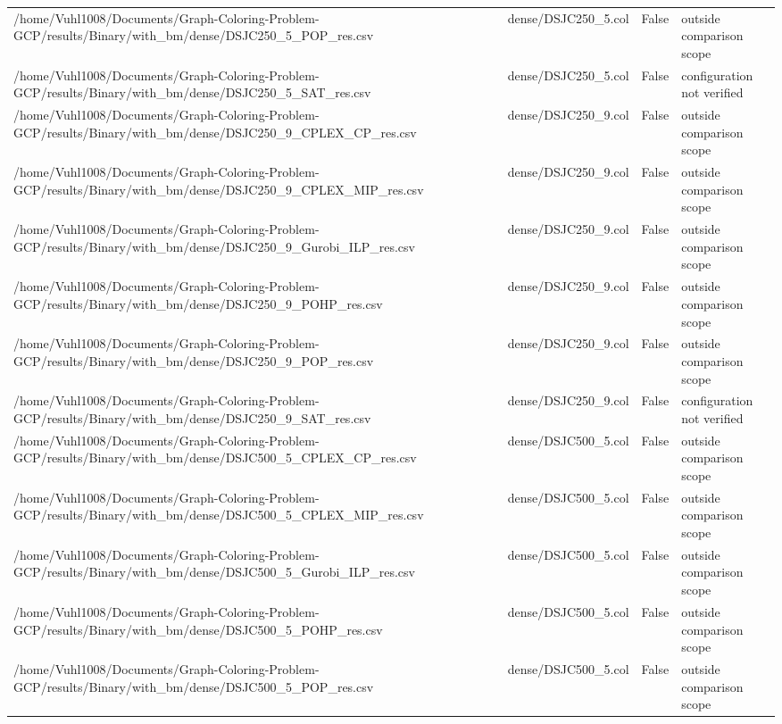 \begin{table}[htbp]
\begin{tabular}{llll}
/home/Vuhl1008/Documents/Graph-Coloring-Problem-GCP/results/Binary/with\_bm/dense/DSJC250\_5\_POP\_res.csv & dense/DSJC250\_5.col & False & outside comparison scope \\
/home/Vuhl1008/Documents/Graph-Coloring-Problem-GCP/results/Binary/with\_bm/dense/DSJC250\_5\_SAT\_res.csv & dense/DSJC250\_5.col & False & configuration not verified \\
/home/Vuhl1008/Documents/Graph-Coloring-Problem-GCP/results/Binary/with\_bm/dense/DSJC250\_9\_CPLEX\_CP\_res.csv & dense/DSJC250\_9.col & False & outside comparison scope \\
/home/Vuhl1008/Documents/Graph-Coloring-Problem-GCP/results/Binary/with\_bm/dense/DSJC250\_9\_CPLEX\_MIP\_res.csv & dense/DSJC250\_9.col & False & outside comparison scope \\
/home/Vuhl1008/Documents/Graph-Coloring-Problem-GCP/results/Binary/with\_bm/dense/DSJC250\_9\_Gurobi\_ILP\_res.csv & dense/DSJC250\_9.col & False & outside comparison scope \\
/home/Vuhl1008/Documents/Graph-Coloring-Problem-GCP/results/Binary/with\_bm/dense/DSJC250\_9\_POHP\_res.csv & dense/DSJC250\_9.col & False & outside comparison scope \\
/home/Vuhl1008/Documents/Graph-Coloring-Problem-GCP/results/Binary/with\_bm/dense/DSJC250\_9\_POP\_res.csv & dense/DSJC250\_9.col & False & outside comparison scope \\
/home/Vuhl1008/Documents/Graph-Coloring-Problem-GCP/results/Binary/with\_bm/dense/DSJC250\_9\_SAT\_res.csv & dense/DSJC250\_9.col & False & configuration not verified \\
/home/Vuhl1008/Documents/Graph-Coloring-Problem-GCP/results/Binary/with\_bm/dense/DSJC500\_5\_CPLEX\_CP\_res.csv & dense/DSJC500\_5.col & False & outside comparison scope \\
/home/Vuhl1008/Documents/Graph-Coloring-Problem-GCP/results/Binary/with\_bm/dense/DSJC500\_5\_CPLEX\_MIP\_res.csv & dense/DSJC500\_5.col & False & outside comparison scope \\
/home/Vuhl1008/Documents/Graph-Coloring-Problem-GCP/results/Binary/with\_bm/dense/DSJC500\_5\_Gurobi\_ILP\_res.csv & dense/DSJC500\_5.col & False & outside comparison scope \\
/home/Vuhl1008/Documents/Graph-Coloring-Problem-GCP/results/Binary/with\_bm/dense/DSJC500\_5\_POHP\_res.csv & dense/DSJC500\_5.col & False & outside comparison scope \\
/home/Vuhl1008/Documents/Graph-Coloring-Problem-GCP/results/Binary/with\_bm/dense/DSJC500\_5\_POP\_res.csv & dense/DSJC500\_5.col & False & outside comparison scope \\

\end{tabular}
\end{table}
